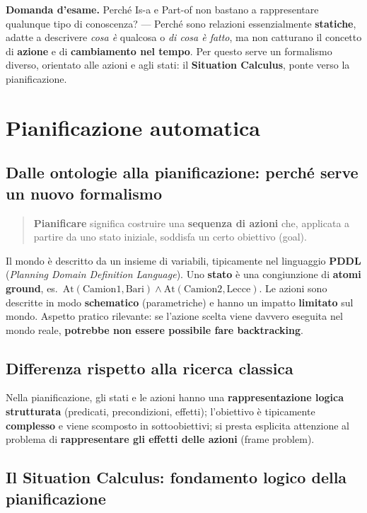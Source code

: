 \documentclass[11pt,a4paper]{report}
\newcommand{\domandaesame}[1]{\begin{esame}\textbf{Domanda d'esame.} #1\end{esame}}
\begin{document}
\domandaesame{Perché Is-a e Part-of non bastano a rappresentare qualunque tipo di conoscenza? --- Perché sono relazioni essenzialmente \textbf{statiche}, adatte a descrivere \emph{cosa è} qualcosa o \emph{di cosa è fatto}, ma non catturano il concetto di \textbf{azione} e di \textbf{cambiamento nel tempo}. Per questo serve un formalismo diverso, orientato alle azioni e agli stati: il \textbf{Situation Calculus}, ponte verso la pianificazione.}

\section{Pianificazione automatica}

\subsection{Dalle ontologie alla pianificazione: perché serve un nuovo formalismo}

\begin{quote}
\textbf{Pianificare} significa costruire una \textbf{sequenza di azioni} che, applicata a partire da uno stato iniziale, soddisfa un certo obiettivo (goal).
\end{quote}

Il mondo è descritto da un insieme di variabili, tipicamente nel linguaggio \textbf{PDDL} (\emph{Planning Domain Definition Language}). Uno \textbf{stato} è una congiunzione di \textbf{atomi ground}, es.\ $\text{At}(\text{Camion1},\text{Bari}) \wedge \text{At}(\text{Camion2},\text{Lecce})$. Le azioni sono descritte in modo \textbf{schematico} (parametriche) e hanno un impatto \textbf{limitato} sul mondo. Aspetto pratico rilevante: se l'azione scelta viene davvero eseguita nel mondo reale, \textbf{potrebbe non essere possibile fare backtracking}.

\subsection{Differenza rispetto alla ricerca classica}

Nella pianificazione, gli stati e le azioni hanno una \textbf{rappresentazione logica strutturata} (predicati, precondizioni, effetti); l'obiettivo è tipicamente \textbf{complesso} e viene scomposto in sottoobiettivi; si presta esplicita attenzione al problema di \textbf{rappresentare gli effetti delle azioni} (frame problem).

\subsection{Il Situation Calculus: fondamento logico della pianificazione}
\end{document}
